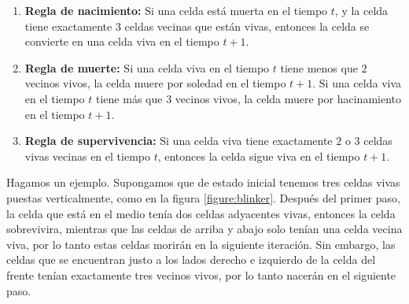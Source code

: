 \begin{enumerate}
    \item \textbf{Regla de nacimiento:} Si una celda est\'a muerta en el tiempo $t$, y la celda tiene exactamente $3$ celdas vecinas que est\'an vivas, entonces la celda se convierte en una celda viva en el tiempo $t+1$.
    \item \textbf{Regla de muerte:} Si una celda viva en el tiempo $t$ tiene menos que $2$ vecinos vivos, la celda muere por soledad en el tiempo $t+1$. Si una celda viva en el tiempo $t$ tiene m\'as que $3$ vecinos vivos, la celda muere por hacinamiento en el tiempo $t+1$.
    \item \textbf{Regla de supervivencia:} Si una celda viva tiene exactamente $2$ o $3$ celdas vivas vecinas en el tiempo $t$, entonces la celda sigue viva en el tiempo $t+1$.
\end{enumerate}

Hagamos un ejemplo. Supongamos que de estado inicial tenemos tres celdas vivas puestas verticalmente, como en la figura \ref{figure:blinker}. Despu\'es del primer paso, la celda que est\'a en el medio ten\'ia dos celdas adyacentes vivas, entonces la celda sobrevivira, mientras que las celdas de arriba y abajo solo ten\'ian una celda vecina viva, por lo tanto estas celdas morir\'an en la siguiente iteraci\'on. Sin embargo, las celdas que se encuentran justo a los lados derecho e izquierdo de la celda del frente ten\'ian exactamente tres vecinos vivos, por lo tanto nacer\'an en el siguiente paso.

